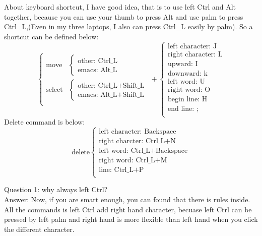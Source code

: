 \documentclass[paper=8.5in:11in, twoside, 12pt, pagesize=pdftex]{book}
\begin{document}
	About keyboard shortcut, I have good idea, that is to use left Ctrl and Alt together, because you can use your thumb to press Alt and use palm to press Ctrl\_L,(Even in my three laptops, I also can press Ctrl\_L easily by palm).
	So a shortcut can be defined below:
	\[ \left\{ \begin{array}{cl}
	            \textrm{move} & \left\{ \begin{array}{c} \textrm{other: Ctrl\_L} \\ \textrm{emacs: Alt\_L} \end{array}  \right. \\
		    \textrm{select} & \left\{ \begin{array}{c} \textrm{other: Ctrl\_L+Shift\_L} \\ \textrm{emacs: Alt\_L+Shift\_L} \end{array}  \right. \\
	           \end{array} \right. + \left\{ \begin{array}{c}
						\textrm{left character: J} \\
						\textrm{right character: L}\\
						\textrm{upward: I}\\
						\textrm{downward: k}\\
						\textrm{left word: U}\\
						\textrm{right word: O} \\
						\textrm{begin line: H}\\
						\textrm{end line: ;}\\
						\end{array} \right.
	\]
	Delete command is below: \\
	\[ \textrm{delete} \left\{ \begin{array}{l}
	            \textrm{left character: Backspace}  \\
		    \textrm{right charcter: Ctrl\_L+N} \\
		     \textrm{left word: Ctrl\_L+Backspace}  \\
		    \textrm{right word: Ctrl\_L+M} \\
		     \textrm{line: Ctrl\_L+P}  \\
	           \end{array} \right.
	\]
	

	Question 1: why always left Ctrl?  \\
	Answer: Now, if you are smart enough, you can found that there is rules inside. All the commands is left Ctrl add right hand character, becuase left Ctrl can be
	pressed by left palm and right hand is more flexible than left hand when you click the different character. \\
\end{document}
